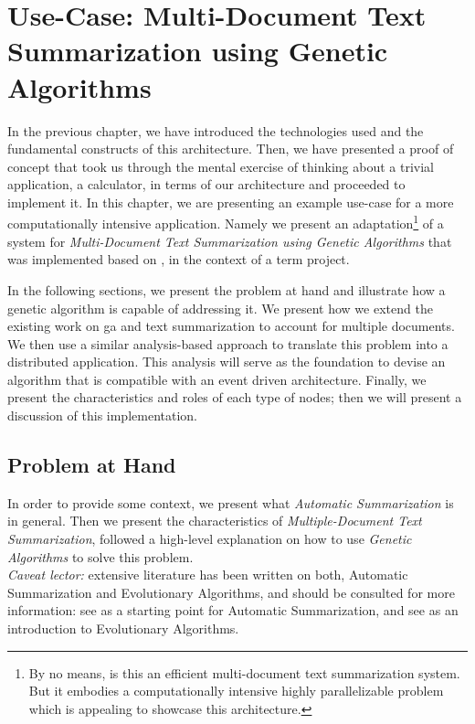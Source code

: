 \documentclass[12pt, titlepage]{uo_temp}
\begin{document}
     \chapter{Use-Case: Multi-Document Text Summarization using Genetic Algorithms}
     In the previous chapter, we have introduced the technologies used and the fundamental
     constructs of this architecture. Then, we have presented a proof of concept that took
     us through the mental exercise of thinking about a trivial application, a calculator,
     in terms of our architecture and proceeded to implement it. In this chapter, we are
     presenting an example use-case for a more computationally intensive
     application. Namely we present an adaptation\footnote{By no means, is
     this an efficient multi-document text summarization system. But it embodies a
     computationally intensive highly parallelizable problem which is appealing to
     showcase this architecture.} of a system for \emph{Multi-Document
       Text Summarization using Genetic Algorithms} that was implemented based on
     \cite{qazvinian2008summarising}, in the context of a term project.
     
     In the following sections, we present the problem at hand and illustrate how a
     genetic algorithm is capable of addressing it. We present how we extend the existing
     work on \gls{ga} and text summarization to account for multiple
     documents. We then use a similar analysis-based approach to translate this problem
     into a distributed application. This analysis will serve as the foundation to devise
     an algorithm that is compatible with an event driven architecture. Finally, we
     present the characteristics and roles of each type of nodes; then we will present a
     discussion of this implementation.

     \section{Problem at Hand}
     
     In order to provide some context, we present what \emph{Automatic Summarization} is
     in general. Then we present the characteristics of \emph{Multiple-Document Text
       Summarization}, followed a high-level explanation on how to use \emph{Genetic
       Algorithms} to solve this problem.\\
 
     \emph{Caveat lector:} extensive literature has
     been written on both, Automatic Summarization and Evolutionary Algorithms, and should
     be consulted for more information: see \cite{mani1999advances} as a starting point
     for Automatic Summarization, and see \cite{eiben2008introduction} as an introduction
     to Evolutionary Algorithms.
\end{document}
